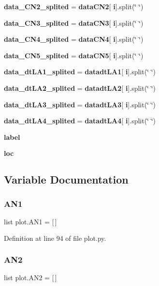\begin{DoxyCompactItemize}
\item 
\textbf{ data\+\_\+\+C\+N2\+\_\+splited} = \textbf{ data\+C\+N2}[\textbf{ i}].split(\char`\"{} \char`\"{})
\item 
\textbf{ data\+\_\+\+C\+N3\+\_\+splited} = \textbf{ data\+C\+N3}[\textbf{ i}].split(\char`\"{} \char`\"{})
\item 
\textbf{ data\+\_\+\+C\+N4\+\_\+splited} = \textbf{ data\+C\+N4}[\textbf{ i}].split(\char`\"{} \char`\"{})
\item 
\textbf{ data\+\_\+\+C\+N5\+\_\+splited} = \textbf{ data\+C\+N5}[\textbf{ i}].split(\char`\"{} \char`\"{})
\item 
\textbf{ data\+\_\+dt\+L\+A1\+\_\+splited} = \textbf{ datadt\+L\+A1}[\textbf{ i}].split(\char`\"{} \char`\"{})
\item 
\textbf{ data\+\_\+dt\+L\+A2\+\_\+splited} = \textbf{ datadt\+L\+A2}[\textbf{ i}].split(\char`\"{} \char`\"{})
\item 
\textbf{ data\+\_\+dt\+L\+A3\+\_\+splited} = \textbf{ datadt\+L\+A3}[\textbf{ i}].split(\char`\"{} \char`\"{})
\item 
\textbf{ data\+\_\+dt\+L\+A4\+\_\+splited} = \textbf{ datadt\+L\+A4}[\textbf{ i}].split(\char`\"{} \char`\"{})
\item 
\textbf{ label}
\item 
\textbf{ loc}
\end{DoxyCompactItemize}


\subsection{Variable Documentation}
\mbox{\label{namespaceplot_a0ff91ff1e1ec9ee872d19cfe55734877}} 
\subsubsection{A\+N1}
{\footnotesize\ttfamily list plot.\+A\+N1 = [$\,$]}



Definition at line 94 of file plot.\+py.

\mbox{\label{namespaceplot_a763de4251e35a932f48819756da07649}} 
\subsubsection{A\+N2}
{\footnotesize\ttfamily list plot.\+A\+N2 = [$\,$]}



